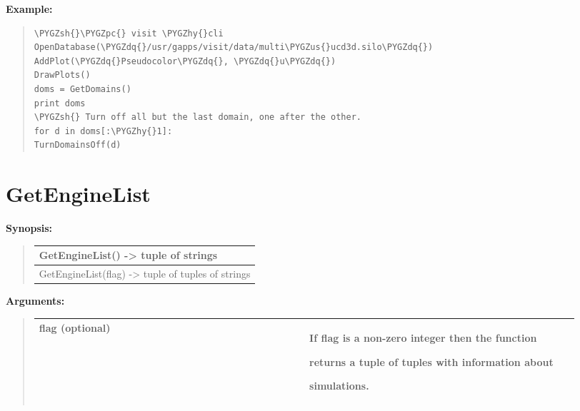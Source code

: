\documentclass[letterpaper,10pt,english]{sphinxmanual}
\def\PYGZus{\char`\_}
\def\PYGZsh{\char`\#}
\def\PYGZpc{\char`\%}
\def\PYGZhy{\char`\-}
\def\PYGZdq{\char`\"}
\begin{document}
\begin{DUlineblock}{0em}
\item[] 
\end{DUlineblock}

\begin{DUlineblock}{0em}
\item[] \textbf{Example:}
\item[] 
\end{DUlineblock}
\begin{quote}

\begin{Verbatim}[commandchars=\\\{\}]
\PYGZsh{}\PYGZpc{} visit \PYGZhy{}cli
OpenDatabase(\PYGZdq{}/usr/gapps/visit/data/multi\PYGZus{}ucd3d.silo\PYGZdq{})
AddPlot(\PYGZdq{}Pseudocolor\PYGZdq{}, \PYGZdq{}u\PYGZdq{})
DrawPlots()
doms = GetDomains()
print doms
\PYGZsh{} Turn off all but the last domain, one after the other.
for d in doms[:\PYGZhy{}1]:
TurnDomainsOff(d)
\end{Verbatim}
\end{quote}


\section{GetEngineList}
\label{functions:getenginelist}
\begin{DUlineblock}{0em}
\item[] \textbf{Synopsis:}
\end{DUlineblock}
\begin{quote}

\begin{tabulary}{\linewidth}{|L|}
\hline

GetEngineList() -\textgreater{} tuple of strings
\\
\hline
GetEngineList(flag) -\textgreater{} tuple of tuples of strings
\\
\hline\end{tabulary}

\end{quote}

\begin{DUlineblock}{0em}
\item[] 
\item[] \textbf{Arguments:}
\end{DUlineblock}
\begin{quote}

\begin{tabular}{|p{0.475\linewidth}|p{0.475\linewidth}|}
\hline

flag (optional)
 & 
\begin{DUlineblock}{0em}
\item[] If flag is a non-zero integer then the function
\item[] returns a tuple of tuples with information about
\item[] simulations.
\end{DUlineblock}
\\
\hline\end{tabular}

\end{quote}
\end{document}
